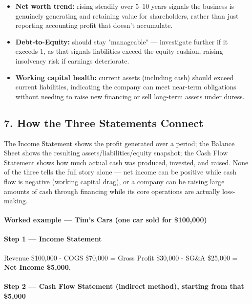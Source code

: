 \documentclass[12pt,openany]{book}
\begin{document}
\begin{itemize}[leftmargin=*]
    \item \textbf{Net worth trend:} rising steadily over 5--10 years signals the business is genuinely generating and retaining value for shareholders, rather than just reporting accounting profit that doesn't accumulate.
    \item \textbf{Debt-to-Equity:} should stay "manageable" --- investigate further if it exceeds 1, as that signals liabilities exceed the equity cushion, raising insolvency risk if earnings deteriorate.
    \item \textbf{Working capital health:} current assets (including cash) should exceed current liabilities, indicating the company can meet near-term obligations without needing to raise new financing or sell long-term assets under duress.
\end{itemize}

\subsection{7. How the Three Statements Connect}

The Income Statement shows the profit generated over a period; the Balance Sheet shows the resulting assets/liabilities/equity snapshot; the Cash Flow Statement shows how much actual cash was produced, invested, and raised. None of the three tells the full story alone --- net income can be positive while cash flow is negative (working capital drag), or a company can be raising large amounts of cash through financing while its core operations are actually loss-making.

\paragraph{Worked example --- Tim's Cars (one car sold for \$100,000)} 

\paragraph{Step 1 --- Income Statement} Revenue \$100,000 - COGS \$70,000 = Gross Profit \$30,000 - SG\&A \$25,000 = \textbf{Net Income \$5,000}.

\paragraph{Step 2 --- Cash Flow Statement (indirect method), starting from that \$5,000} 
\end{document}
